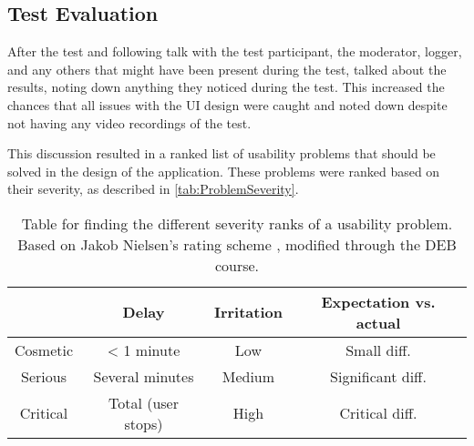 \subsection{Test Evaluation}
After the test and following talk with the test participant, the moderator, logger, and any others that might have been present during the test, talked about the results, noting down anything they noticed during the test. This increased the chances that all issues with the UI design were caught and noted down despite not having any video recordings of the test. 
\par
This discussion resulted in a ranked list of usability problems that should be solved in the design of the application. These problems were ranked based on their severity, as described in \autoref{tab:ProblemSeverity}.

\begin{table}[H]
    \centering
    \begin{tabular}{|c||c|c|c|}
        \hline
        & Delay & Irritation & Expectation vs. actual
        \\
        \hline
        \hline
        Cosmetic & < 1 minute & Low & Small diff.
        \\
        \hline
        Serious & Several minutes & Medium & Significant diff.
        \\
        \hline
        Critical & Total (user stops) & High & Critical diff.
        \\
        \hline
    \end{tabular}
    \caption{Table for finding the different severity ranks of a usability problem. Based on Jakob Nielsen's rating scheme \citep[Table 8]{UsabilityEngineering}, modified through the DEB course.}
    \label{tab:ProblemSeverity}
\end{table}


\newpage

